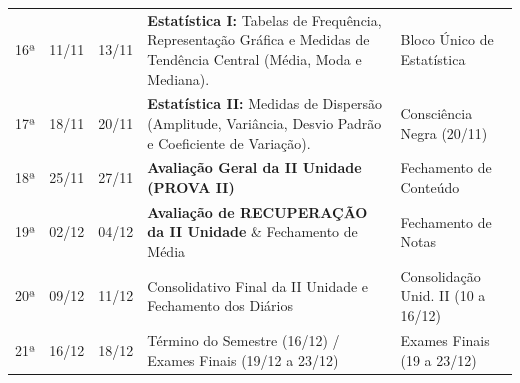 \documentclass[10pt,a4paper]{article}
\begin{document}
\begin{longtable}{p{0.8cm} p{1.8cm} p{1.8cm} p{7.5cm} p{4.2cm}}
\rowcolor{lightgrey}
16ª & 11/11 & 13/11 & \textbf{Estatística I:} Tabelas de Frequência, Representação Gráfica e Medidas de Tendência Central (Média, Moda e Mediana). & Bloco Único de Estatística \\
17ª & 18/11 & 20/11 & \textbf{Estatística II:} Medidas de Dispersão (Amplitude, Variância, Desvio Padrão e Coeficiente de Variação). & Consciência Negra (20/11) \\
\rowcolor{lightgrey}
18ª & 25/11 & 27/11 & \textbf{Avaliação Geral da II Unidade (PROVA II)} & Fechamento de Conteúdo \\
19ª & 02/12 & 04/12 & \textbf{Avaliação de RECUPERAÇÃO da II Unidade} \& Fechamento de Média & Fechamento de Notas \\
\rowcolor{lightgrey}
20ª & 09/12 & 11/12 & Consolidativo Final da II Unidade e Fechamento dos Diários & Consolidação Unid. II (10 a 16/12) \\
21ª & 16/12 & 18/12 & Término do Semestre (16/12) / Exames Finais (19/12 a 23/12) & Exames Finais (19 a 23/12) \\

\end{longtable}
\end{document}
